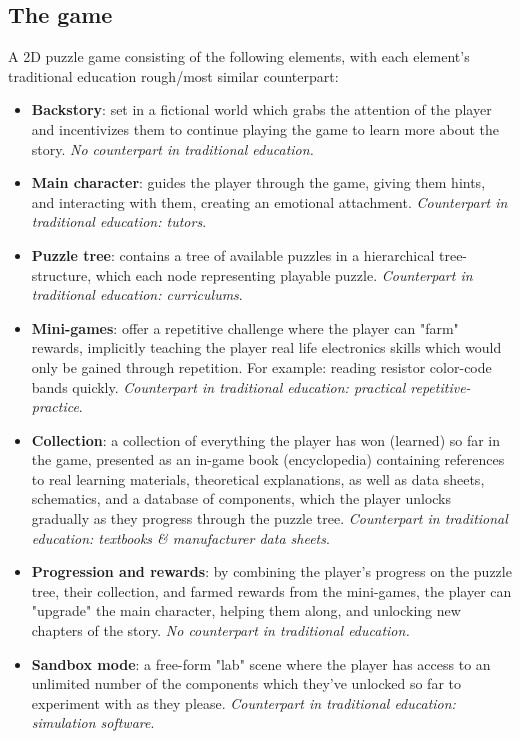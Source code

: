 \documentclass[twoside,a4paper,11pt]{article}
\begin{document}
\begin{multicols}{2}
\subsection{The game}
A 2D puzzle game consisting of the following elements, with each element's traditional education rough/most similar counterpart:
\begin{itemize}
    \item \textbf{Backstory}: set in a fictional world which grabs the attention of the player and incentivizes them to continue playing the game to learn more about the story. \textit{No counterpart in traditional education.}
    \item \textbf{Main character}: guides the player through the game, giving them hints, and interacting with them, creating an emotional attachment. \textit{Counterpart in traditional education: tutors}. 
    \item \textbf{Puzzle tree}: contains a tree of available puzzles in a hierarchical tree-structure, which each node representing playable puzzle. \textit{Counterpart in traditional education: curriculums}.
    \item \textbf{Mini-games}: offer a repetitive challenge where the player can "farm" rewards, implicitly teaching the player real life electronics skills which would only be gained through repetition. For example: reading resistor color-code bands quickly. \textit{Counterpart in traditional education: practical repetitive-practice}.
    \item \textbf{Collection}: a collection of everything the player has won (learned) so far in the game, presented as an in-game book (encyclopedia) containing references to real learning materials, theoretical explanations, as well as data sheets, schematics, and a database of components, which the player unlocks gradually as they progress through the puzzle tree. \textit{Counterpart in traditional education: textbooks \& manufacturer data sheets}.
    \item \textbf{Progression and rewards}: by combining the player's progress on the puzzle tree, their collection, and farmed rewards from the mini-games, the player can "upgrade" the main character, helping them along, and unlocking new chapters of the story. \textit{No counterpart in traditional education.}
    \item \textbf{Sandbox mode}: a free-form "lab" scene where the player has access to an unlimited number of the components which they've unlocked so far to experiment with as they please. \textit{Counterpart in traditional education: simulation software}.

\end{itemize}
\end{multicols}
\end{document}
